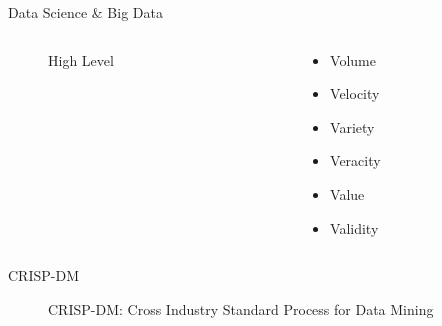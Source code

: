 
\begin{frame}{Data Science \& Big Data}
	\begin{columns}
		
		\begin{column}{0.65\textwidth}
			\begin{tcolorbox}[colback=white, colframe=ElixirPurple, arc=3mm, boxrule=0mm, height=0.8\textheight, valign=center, title=DS Perspective]
					\begin{figure}[htbp]
					\centering
					\resizebox{\columnwidth}{!}{}
					\caption{High Level}
				\end{figure}
			\end{tcolorbox}
		\end{column}
		
		\begin{column}{0.25\textwidth}
			\begin{tcolorbox}[colback=white, colframe=ElixirPurple, arc=3mm, boxrule=0mm, height=0.8\textheight, valign=center, title=Big Data]
				
				\begin{itemize}
					\item Volume
					\item Velocity
					\item Variety
					\vspace{3pt}
					\item Veracity
					\vspace{3pt}
					\item Value
					\item Validity
					
				\end{itemize}
				
			\end{tcolorbox}
		\end{column}
	\end{columns}
\end{frame}

\begin{frame}{CRISP-DM}
	\begin{figure}[htbp]
		\centering
		\resizebox{\columnwidth}{!}{}
		\caption{CRISP-DM: Cross Industry Standard Process for Data Mining}
	\end{figure}
\end{frame}